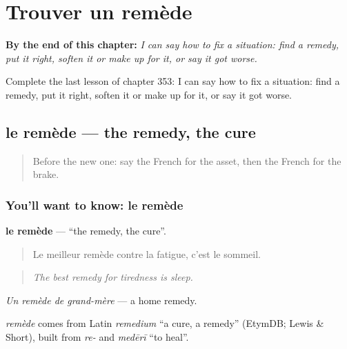 
\chapter{Trouver un remède}
\label{ch:fr-trouver-un-remede}

\begin{chapteropening}
\textbf{By the end of this chapter:} \emph{I can say how to fix a situation: find a remedy, put it right, soften it or make up for it, or say it got worse.}

Complete the last lesson of chapter 353: I can say how to fix a situation: find a remedy, put it right, soften it or make up for it, or say it got worse.
\end{chapteropening}

\section[le remède]{le remède — the remedy, the cure}

\label{lesson:FR-C353-remede}



\begin{quote}
Before the new one: say the French for the asset, then the French for the brake.
\end{quote}

\subsection*{You'll want to know: le remède}
\textbf{le remède} — \textquotedblleft{}the remedy, the cure\textquotedblright{}.

\begin{quote}
Le meilleur remède contre la fatigue, c'est le sommeil.
\end{quote}

\begin{quote}
\emph{The best remedy for tiredness is sleep.}
\end{quote}

\emph{Un remède de grand-mère} — a home remedy.

\begin{cousinweb}
\emph{remède} comes from Latin \emph{remedium} \textquotedblleft{}a cure, a remedy\textquotedblright{} (EtymDB; Lewis \& Short), built from \emph{re-} and \emph{medērī} \textquotedblleft{}to heal\textquotedblright{}.
\end{cousinweb}

